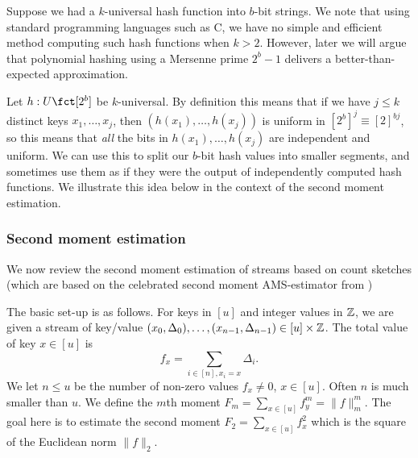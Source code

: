 Suppose we had a $k$-universal hash function into $b$-bit strings.
We note that using standard programming languages such as C, we have
no simple and efficient method computing such hash
functions when $k>2$. However, later we will argue that polynomial
hashing using a Mersenne prime $2^b-1$ delivers a better-than-expected
approximation.

Let $h:U\fct [2^b]$ be $k$-universal. By definition this
means that if we have $j\leq k$ distinct keys $x_1,\ldots,x_j$, then
$(h(x_1),\ldots,h(x_j))$ is uniform in $[2^b]^j\equiv [2]^{bj}$,
so this means that \emph{all} the bits in $h(x_1),\ldots,h(x_j)$ are
independent and uniform. We can use this to split our $b$-bit hash
values into smaller segments, and sometimes use them as if
they were the output of independently computed hash functions.
We illustrate this idea below in the context of the second moment estimation.

\subsubsection{Second moment estimation}
We now review the second moment estimation of streams based on count
sketches \cite{charikar04count-sketch} (which are based on the
celebrated second moment AMS-estimator from \cite{alon96frequency})

The basic set-up is as follows.  For keys in $[u]$ and integer values in $\mathbb Z$, we are given a stream of key/value $(x_0,\Delta_0),\ldots, (x_{n-1},\Delta_{n-1})\in [u]\times\mathbb Z$. The
total value of key $x\in[u]$ is
\[f_x=\sum_{i\in[n],x_i=x} \Delta_i.\]
We let $n\leq u$ be  the number of non-zero values
$f_x\neq 0$, $x\in [u]$. Often $n$ is much smaller than $u$.
We define the $m$th moment
$F_m=\sum_{x\in [u]}f_y^m=\|f\|_m^m$. The goal here is to
estimate the second moment $F_2=\sum_{x\in [u]}f_x^2$ which is the square of the Euclidean norm $\|f\|_2$. 

